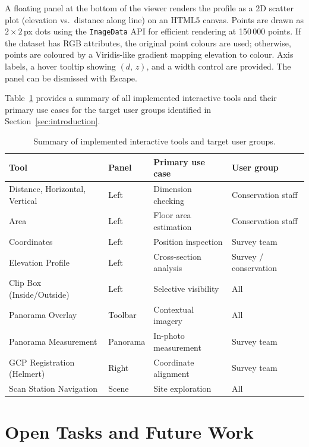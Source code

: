 A floating panel at the bottom of the viewer renders the profile as a 2D
scatter plot (elevation vs.\ distance along line) on an HTML5 canvas. Points
are drawn as $2 \times 2$\,px dots using the \texttt{ImageData} API for
efficient rendering at 150\,000 points. If the dataset has RGB attributes, the
original point colours are used; otherwise, points are coloured by a
Viridis-like gradient mapping elevation to colour. Axis labels, a hover
tooltip showing $(d,\,z)$, and a width control are provided. The panel can be
dismissed with Escape.

\medskip

Table~\ref{tab:tools} provides a summary of all implemented interactive tools
and their primary use cases for the target user groups identified in
Section~\ref{sec:introduction}.

\begin{table}[h]
\centering
\caption{Summary of implemented interactive tools and target user groups.}
\label{tab:tools}
\begin{tabular}{llll}
\toprule
\textbf{Tool} & \textbf{Panel} & \textbf{Primary use case} & \textbf{User group} \\
\midrule
Distance, Horizontal, Vertical & Left & Dimension checking & Conservation staff \\
Area                           & Left & Floor area estimation & Conservation staff \\
Coordinates                    & Left & Position inspection & Survey team \\
Elevation Profile              & Left & Cross-section analysis & Survey / conservation \\
Clip Box (Inside/Outside)      & Left & Selective visibility & All \\
Panorama Overlay               & Toolbar & Contextual imagery & All \\
Panorama Measurement           & Panorama & In-photo measurement & Survey team \\
GCP Registration (Helmert)     & Right & Coordinate alignment & Survey team \\
Scan Station Navigation        & Scene  & Site exploration & All \\
\bottomrule
\end{tabular}
\end{table}


\chapter{Open Tasks and Future Work}
\label{ch:open_tasks}

